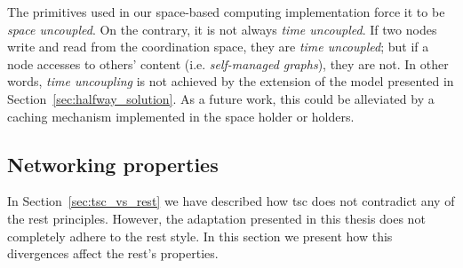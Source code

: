 The primitives used in our space-based computing implementation force it to be \emph{space uncoupled}.
On the contrary, it is not always \emph{time uncoupled}.
If two nodes write and read from the coordination space, they are \emph{time uncoupled};
but if a node accesses to others' content (i.e. \emph{self-managed graphs}), they are not.
In other words, \emph{time uncoupling} is not achieved by the extension of the model presented in Section~\ref{sec:halfway_solution}.
As a future work, this could be alleviated by a caching mechanism implemented in the space holder or holders. %




\subsection{Networking properties} %
\label{sec:network_properties}

In Section~\ref{sec:tsc_vs_rest} we have described how \ac{tsc} does not contradict any of the \ac{rest} principles.
However, the adaptation presented in this thesis does not completely adhere to the \ac{rest} style.
In this section we present how this divergences affect the \ac{rest}'s properties.



